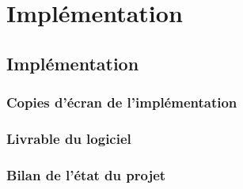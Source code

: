 \part{Implémentation}

\chapter{Implémentation}

\section{Copies d'écran de l'implémentation}

\section{Livrable du logiciel}

\section{Bilan de l'état du projet}